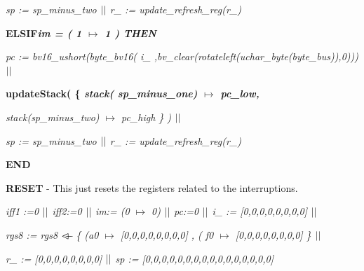 \documentclass[a4paper]{llncs}
\begin{document}
\begin{sloppypar}
\hspace*{0.10in}\it sp \rm := \it sp\_minus\_two  $\mbox{$\mid\mid$}$ \hspace*{0.10in}\it
r\_ \rm := \it update\_refresh\_reg\rm (\it r\_\rm )\hspace*{0.85in}

\hspace*{0.00in}\bf ELSIF\hspace*{0.10in}\it im \rm = \rm ( \rm 1  $\mapsto$ 
\rm 1 \rm ) \bf THEN  \hspace*{0.70in}

\hspace*{0.10in}\it pc \rm := \it bv16\_ushort\rm (\it byte\_bv16\rm ( \it i\_
\rm ,\it bv\_clear\rm (\it rotateleft\rm (\it uchar\_byte\rm (\it byte\_bus\rm )\rm )\rm ,\rm 0\rm )\rm )\rm )$\mbox{$\mid\mid$}$

\hspace*{0.10in}\bf updateStack\rm ( \rm \{ \it stack\rm ( \it
sp\_minus\_one\rm )  $\mapsto$  \it pc\_low\rm ,

\hspace*{0.10in}\it stack\rm (\it sp\_minus\_two\rm )  $\mapsto$  \it pc\_high
\rm \} \rm )  $\mbox{$\mid\mid$}$

\hspace*{0.10in}\it sp \rm := \it sp\_minus\_two  $\mbox{$\mid\mid$}$ \hspace*{0.10in}\it
r\_ \rm := \it update\_refresh\_reg\rm (\it r\_\rm )

\hspace*{0.00in}\bf END\hspace*{0.10in}\\
\end{sloppypar}


\textbf{RESET}  - This just resets the registers related to the interruptions.

\begin{sloppypar}
\it iff1 \rm :=\rm 0 $\mbox{$\mid\mid$}$ \it iff2\rm :=\rm 0 $\mbox{$\mid\mid$}$  \it  im\rm := \rm (\rm 0 $\mapsto$ \rm 0\rm )  $\mbox{$\mid\mid$}$ 
\it pc\rm :=\rm 0 $\mbox{$\mid\mid$}$ \it i\_ \rm := [0,0,0,0,0,0,0,0] $\mbox{$\mid\mid$}$

\it rgs8 \rm := \it rgs8  $\lover$  \rm \{ \rm (\it a0  $\mapsto$ \rm [0,0,0,0,0,0,0,0] , \rm (\it
f0 $\mapsto$ \rm [0,0,0,0,0,0,0,0] \rm \} $\mbox{$\mid\mid$}$

\it r\_  \rm := [0,0,0,0,0,0,0,0] $\mbox{$\mid\mid$}$ \it sp \rm := [0,0,0,0,0,0,0,0,0,0,0,0,0,0,0,0]\\
\end{sloppypar}

\end{document}
